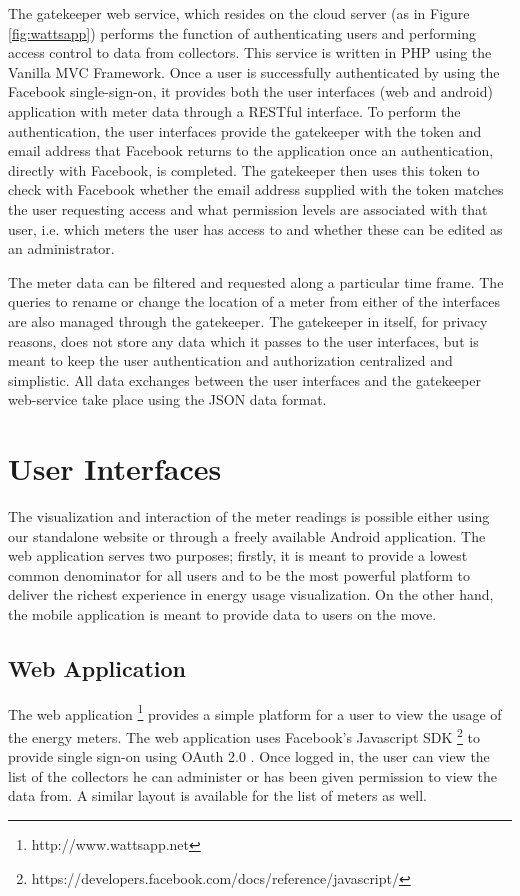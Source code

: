 \documentclass[10pt, conference, compsocconf, english]{IEEEtran}
\begin{document}
The gatekeeper web service, which resides on the cloud server (as
in Figure \ref{fig:wattsapp}) performs the function of authenticating
users and performing access control to data from collectors. This
service is written in PHP using the Vanilla MVC Framework. Once a
user is successfully authenticated by using the Facebook single-sign-on,
it provides both the user interfaces (web and android) application
with meter data through a RESTful interface. To perform the authentication,
the user interfaces provide the gatekeeper with the token and email
address that Facebook returns to the application once an authentication,
directly with Facebook, is completed. The gatekeeper then uses this
token to check with Facebook whether the email address supplied with
the token matches the user requesting access and what permission levels
are associated with that user, i.e. which meters the user has access
to and whether these can be edited as an administrator.

The meter data can be filtered and requested along a particular time
frame. The queries to rename or change the location of a meter from
either of the interfaces are also managed through the gatekeeper.
The gatekeeper in itself, for privacy reasons, does not store any
data which it passes to the user interfaces, but is meant to keep
the user authentication and authorization centralized and simplistic.
All data exchanges between the user interfaces and the gatekeeper
web-service take place using the JSON data format.

\section{User Interfaces}

The visualization and interaction of the meter readings is possible
either using our standalone website or through a freely available
Android application. The web application serves two purposes; firstly,
it is meant to provide a lowest common denominator for all users and
to be the most powerful platform to deliver the richest experience
in energy usage visualization. On the other hand, the mobile application
is meant to provide data to users on the move.


\subsection{Web Application}

The web application%
\footnote{http://www.wattsapp.net%
} provides a simple platform for a user to view the usage of the energy
meters. The web application uses Facebook's Javascript SDK %
\footnote{https://developers.facebook.com/docs/reference/javascript/%
} to provide single sign-on using OAuth 2.0 \cite{oauth}. Once logged
in, the user can view the list of the collectors he can administer
or has been given permission to view the data from. A similar layout
is available for the list of meters as well.
\end{document}
